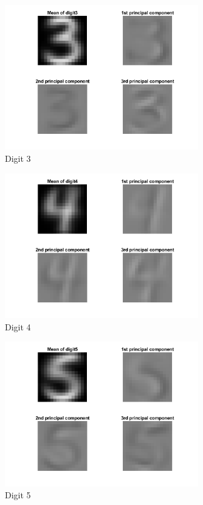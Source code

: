 \documentclass[12pt]{article}
\begin{document}
\begin{figure}[H]
\begin{center}
    \caption{Digit 3}
    \includegraphics[width=0.75\textwidth]{images/digit3.png}
\end{center}
\end{figure}

\begin{figure}[H]
\begin{center}
    \caption{Digit 4}
    \includegraphics[width=0.75\textwidth]{images/digit4.png}
\end{center}
\end{figure}

\begin{figure}[H]
\begin{center}
    \caption{Digit 5}
    \includegraphics[width=0.75\textwidth]{images/digit5.png}
\end{center}
\end{figure}
\end{document}
